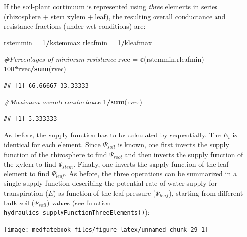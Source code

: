 \documentclass[]{book}
\newenvironment{Shaded}{\begin{snugshade}}{\end{snugshade}}
\newcommand{\KeywordTok}[1]{\textcolor[rgb]{0.13,0.29,0.53}{\textbf{#1}}}
\newcommand{\DecValTok}[1]{\textcolor[rgb]{0.00,0.00,0.81}{#1}}
\newcommand{\StringTok}[1]{\textcolor[rgb]{0.31,0.60,0.02}{#1}}
\newcommand{\CommentTok}[1]{\textcolor[rgb]{0.56,0.35,0.01}{\textit{#1}}}
\newcommand{\OperatorTok}[1]{\textcolor[rgb]{0.81,0.36,0.00}{\textbf{#1}}}
\newcommand{\NormalTok}[1]{#1}
\begin{document}
If the soil-plant continuum is represented using \emph{three} elements
in series (rhizosphere + stem xylem + leaf), the resulting overall
conductance and resistance fractions (under wet conditions) are:

\begin{Shaded}
\begin{Highlighting}[]
\NormalTok{rstemmin =}\StringTok{ }\DecValTok{1}\OperatorTok{/}\NormalTok{kstemmax}
\NormalTok{rleafmin =}\StringTok{ }\DecValTok{1}\OperatorTok{/}\NormalTok{kleafmax}

\CommentTok{#Percentages of minimum resistance}
\NormalTok{rvec =}\StringTok{ }\KeywordTok{c}\NormalTok{(rstemmin,rleafmin)}
\DecValTok{100}\OperatorTok{*}\NormalTok{rvec}\OperatorTok{/}\KeywordTok{sum}\NormalTok{(rvec)}
\end{Highlighting}
\end{Shaded}

\begin{verbatim}
## [1] 66.66667 33.33333
\end{verbatim}

\begin{Shaded}
\begin{Highlighting}[]
\CommentTok{#Maximum overall conductance}
\DecValTok{1}\OperatorTok{/}\KeywordTok{sum}\NormalTok{(rvec)}
\end{Highlighting}
\end{Shaded}

\begin{verbatim}
## [1] 3.333333
\end{verbatim}

As before, the supply function has to be calculated by sequentially. The
\(E_i\) is identical for each element. Since \(\Psi_{soil}\) is known,
one first inverts the supply function of the rhizosphere to find
\(\Psi_{root}\) and then inverts the supply function of the xylem to
find \(\Psi_{stem}\). Finally, one inverts the supply function of the
leaf element to find \(\Psi_{leaf}\). As before, the three operations
can be summarized in a single supply function describing the potential
rate of water supply for transpiration (\(E\)) as function of the leaf
pressure (\(\Psi_{leaf}\)), starting from different bulk soil
(\(\Psi_{soil}\)) values (see function
\texttt{hydraulics\_supplyFunctionThreeElements()}):

\begin{center}\texttt{[image: medfatebook\_files/figure-latex/unnamed-chunk-29-1]} \end{center}
\end{document}
